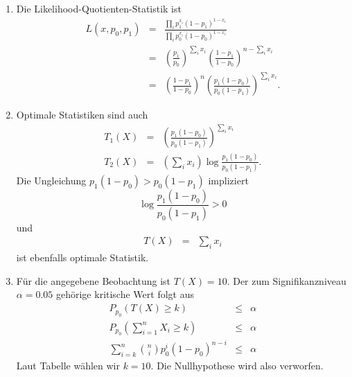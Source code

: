\solution
\begin{enumerate}

    \item Die Likelihood-Quotienten-Statistik ist 
        \begin{eqnarray*}
            L(x,p_0,p_1) &=& \frac{ \prod_{i} p_1^{x_i}\left( 1-p_1 \right)^{1-x_i} }{ \prod_{i} p_0^{x_i}\left( 1-p_0 \right)^{1-x_i} } \\
            &=& \left( \frac{p_1}{p_0} \right)^{\sum_{i} x_i} \left( \frac{1-p_1}{1-p_0} \right)^{n - \sum_{i} x_i} \\ 
            &=& \left( \frac{1-p_1}{1-p_0} \right)^n 
            \left( \frac{ p_1 \left( 1-p_0 \right)}{ p_0 \left( 1-p_1 \right)} \right)^{\sum_{i}^{} x_i}.
        \end{eqnarray*}
    \item Optimale Statistiken sind auch
        \begin{eqnarray*}
            T_1(X) &=&  \left( \frac{ p_1 \left( 1-p_0 \right)}{ p_0 \left( 1-p_1 \right)} \right)^{\sum_{i}^{} x_i} \\
            T_2(X) &=& \left( \sum_{i}^{} x_i \right) \log \frac{ p_1 \left( 1-p_0 \right)}{ p_0 \left( 1-p_1 \right)}. 
        \end{eqnarray*}
        Die Ungleichung $p_1(1-p_0)> p_0(1-p_1)$ impliziert
        \begin{equation*}
            \log \frac{ p_1 \left( 1-p_0 \right)}{ p_0 \left( 1-p_1 \right)} >0 
        \end{equation*}
        und
        \begin{eqnarray*}
            T(X) &=& \sum_{i}^{} x_i
        \end{eqnarray*}
        ist ebenfalls optimale Statistik.
    \item Für die angegebene Beobachtung ist $T(X)=10$. Der zum Signifikanzniveau $\alpha=0.05$ 
        gehörige kritische Wert folgt aus
        \begin{eqnarray*}
            P_{p_0} \left( T(X) \geq k \right) &\leq& \alpha \\
            P_{p_0} \left( \sum_{i=1}^{n} X_i \geq k \right) &\leq& \alpha \\
            \sum_{i=k}^{n} \binom{n}{i} p_0^i \left( 1-p_0 \right)^{n-i} & \leq & \alpha
        \end{eqnarray*}
        Laut Tabelle wählen wir $k=10$. Die Nullhypothese wird also verworfen.
\end{enumerate}





